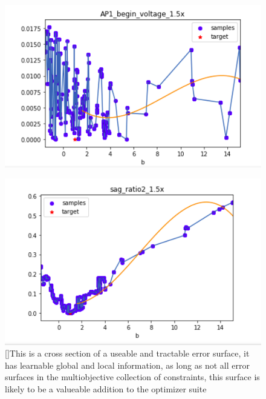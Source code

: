 \begin{figure}
\centering
      \includegraphics[scale=0.85]{figures/parameter_b_hopeless_surface.png}
      \label{fig:probably_smooth_constraint}
\end{figure}

\begin{figure}      
\centering
      \includegraphics[scale=0.85]{figures/parameter_b_friendly_surface.png}
      []{This is a cross section of a useable and tractable error surface, it has learnable global and local information, as long as not all error surfaces in the multiobjective collection of constraints, this surface is likely to be a valueable addition to the optimizer suite}
      \label{fig:test2}
\end{figure}



